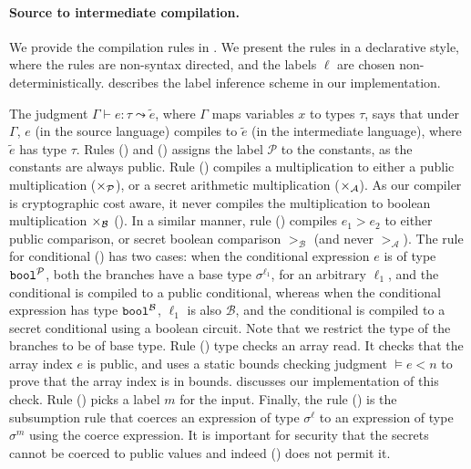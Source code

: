 \paragraph{Source to intermediate compilation.} We provide the compilation
rules in . We present the rules in a
declarative style, where the rules are non-syntax
directed, and the labels $\ell$ are chosen
non-deterministically.  describes the label  inference
scheme in our implementation.

The judgment $\Gamma \vdash e : \tau \leadsto \widetilde{e}$, where
$\Gamma$ maps variables $x$ to types $\tau$, says that
under $\Gamma$, $e$ (in the source language) compiles to $\widetilde{e}$
(in the intermediate language), where $\widetilde{e}$ has type $\tau$.
Rules ({}) and ({}) assigns the label
$\mathcal{P}$ to the constants, as the constants are always
public. Rule ({})
compiles a multiplication to either a public multiplication  ($\times_{\mathcal{P}}$), or a
secret arithmetic multiplication ($\times_{\mathcal{A}}$). As
our compiler is cryptographic cost aware, it never compiles the
multiplication to boolean multiplication $\times_{\mathcal{B}}$ (). In a similar manner,
rule ({}) compiles $e_{1} > e_{2}$ to either public comparison,
or secret boolean comparison $>_\mathcal{B}$ (and never
$>_{\mathcal{A}}$).
%
The rule for conditional
({}) has two cases: when the conditional expression $e$ is of
type ${\mathtt{bool}}^{\mathcal{P}}$, both the branches have a base type
$\sigma^{\ell_{1}}$, for an arbitrary $\ell_{1}$, and the conditional is
compiled to a public conditional, whereas when the conditional
expression has type ${\mathtt{bool}}^{\mathcal{B}}$, $\ell_{1}$ is also
$\mathcal{B}$, and the conditional is compiled to a secret conditional
using a boolean circuit. Note that we restrict the type of the branches
to be of base type. 
Rule ({}) type checks an array read. It checks
that the array index $e$ is public, and uses a static bounds checking
judgment $ \models e < n$ to prove that the array index is in
bounds.  discusses our implementation of this
check. Rule ({}) picks a label $m$ for the input. Finally,
the rule ({}) is the subsumption rule that coerces an expression of
type $\sigma^{\ell}$ to an expression of type $\sigma^{m}$ using the
coerce expression. It is important for security that the secrets
cannot be coerced to public values and indeed ({}) does not
permit it.

